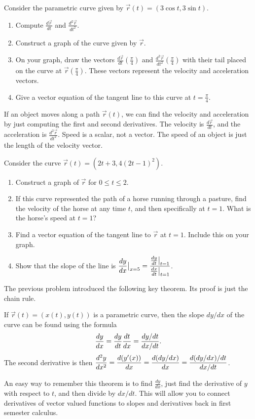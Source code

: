 \begin{problem}  
Consider the parametric curve given by $\vec r(t)=( 3\cos t, 3\sin t )$. 
\begin{enumerate}
\item Compute $\frac{d\vec r}{dt}$ and $\frac{d^2\vec r}{dt^2}$. 
\item Construct a graph of the curve given by $\vec r$.  
\item On your graph, draw the vectors $\frac{d\vec r}{dt}\left(\frac{\pi}{4}\right)$ and $\frac{d^2\vec r}{dt^2}\left(\frac{\pi}{4}\right)$ with their tail placed on the curve at $\vec r\left(\frac{\pi}{4}\right)$. These vectors represent the velocity and acceleration vectors.
\item Give a vector equation of the tangent line to this curve at $t=\frac{\pi}{4}$. 
\end{enumerate}
\end{problem}

\begin{definition}\label{definition velocity acceleration}
If an object moves along a path $\vec r(t)$, we can find the velocity and acceleration by just computing the first and second derivatives. The velocity is $\frac{d\vec r}{dt}$, and the acceleration is $\frac{d^2\vec r}{dt^2}$. Speed is a scalar, not a vector. The speed of an object is just the length of the velocity vector.
\end{definition}

\begin{problem}
Consider the curve $\vec r(t) = (2t+3, 4(2t-1)^2)$.
\begin{enumerate}
\item Construct a graph of $\vec r$ for $0\leq t\leq 2$. 
\item If this curve represented the path of a horse running through a pasture, find the velocity of the horse at any time $t$, and then specifically at $t=1$. What is the horse's speed at $t=1$?
\item Find a vector equation of the tangent line to $\vec r$ at $t=1$.  Include this on your graph.
\item Show that the slope of the line is $\displaystyle \frac{dy}{dx}\big|_{x=5} = \frac{\frac{dy}{dt}\big|_{t=1}}{\frac{dx}{dt}\big|_{t=1}}$.
\end{enumerate} 
\end{problem}

The previous problem introduced the following key theorem.  Its proof is just the chain rule.
\begin{theorem}
If $\vec r(t) = (x(t),y(t))$ is a parametric curve, then the slope $dy/dx$ of the curve can be found using the formula 
$$\displaystyle\frac{dy}{dx} = \frac{dy}{dt}\frac{dt}{dx} = \frac{dy/dt}{dx/dt}.$$
The second derivative is then $\displaystyle\frac{d^2y}{dx^2} = \frac{d(y'(x))}{dx} = \frac{d(dy/dx)}{dx}=\frac{d(dy/dx)/dt}{dx/dt}$.
\end{theorem}
An easy way to remember this theorem is to find $\frac{dy}{dx}$, just find the derivative of $y$ with respect to $t$, and then divide by $dx/dt$. This will allow you to connect derivatives of vector valued functions to slopes and derivatives back in first semester calculus.

